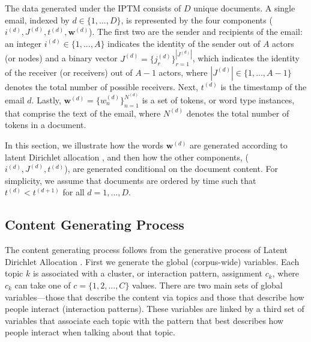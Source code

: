 \documentclass[a4paper]{article}
\begin{document}
The data generated under the IPTM consists of $D$ unique documents. A single email, indexed by $d \in \{1,...,D\}$, is represented by the four components ($i^{(d)}, J^{(d)}, t^{(d)},  \boldsymbol{w}^{(d)}$). The first two are the sender and recipients of the email: an integer $i^{(d)} \in \{1,...,A\}$ indicates the identity of the sender out of $A$ actors (or nodes) and a binary vector $J^{(d)} = \{j_r^{(d)}\}_{r=1}^{|J^{(d)}|} $, which indicates the identity of the receiver (or receivers) out of $A-1$ actors, where $|J^{(d)}|\in \{1,...,A-1\}$ denotes the total number of possible receivers. Next, $t^{(d)}$ is the timestamp of the email $d$. Lastly, $\boldsymbol{w}^{(d)} = \{w^{(d)}_n \}_{n=1}^{N^{(d)}}$ is a set of tokens, or word type instances, that comprise the text of the email, where $N^{(d)}$ denotes the total number of tokens in a document. 

In this section, we illustrate how the words $\boldsymbol{w}^{(d)}$ are generated according to latent Dirichlet allocation \citep{Blei2003}, and then how the other components, ($i^{(d)}, J^{(d)}, t^{(d)}$), are generated conditional on the document content. For simplicity, we assume that documents are ordered by time such that $t^{(d)} < t^{(d+1)}$ for all $d=1, ..., D$. 
\subsection{Content Generating Process} \label{subsec: Content Generating Process} 
The content generating process follows from the generative process of Latent Dirichlet Allocation \cite{Blei2003}. First we generate the global (corpus-wide) variables. Each topic $k$ is associated with a cluster, or interaction pattern, assignment $c_k$, where $c_k$ can take one of $c = \{1,2,...,C\}$ values.  There are two main sets of global variables---those that describe the content via topics and those that describe how people interact (interaction patterns). These variables are linked by a third set of variables that associate each topic with the pattern that best describes how people interact when talking about that topic. 
\end{document}
